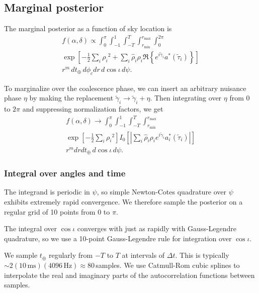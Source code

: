\documentclass[amsmath,amssymb,aps,prx,reprint,nopreprintnumbers,nofootinbib]{revtex4-1}
\begin{document}
\subsection{Marginal posterior}

The marginal posterior as a function of sky location is
%
\begin{multline}
    f(\alpha, \delta) \propto
    \int_{0}^{\pi}
    \int_{-1}^{1}
    \int_{-T}^{T}
    \int_{r_\mathrm{min}}^{r_\mathrm{max}}
    \int_{0}^{2\pi} \\
    \exp \left[ - \frac{1}{2} \sum_i {\rho_i}^2
        + \sum_i \hat\rho_i \rho_i \Re \left\{ e^{i \tilde{\gamma}_i}
        a^*(\tilde{\tau}_i)
        \right\}
    \right] \\
    r^m \, dt_\oplus \, d\phi_c dr \, d\cos{\iota} \, d\psi.
\end{multline}

To marginalize over the coalescence phase, we can insert an arbitrary nuisance phase $\eta$ by making the replacement $\tilde{\gamma}_i \rightarrow \tilde{\gamma}_i + \eta$. Then integrating over $\eta$ from $0$ to $2\pi$ and suppressing normalization factors, we get
%
\begin{multline}
    f(\alpha, \delta) \rightarrow
    \int_{0}^{\pi}
    \int_{-1}^{1}
    \int_{-T}^{T}
    \int_{r_\mathrm{min}}^{r_\mathrm{max}} \\
    \exp \left[ - \frac{1}{2} \sum_i {\rho_i}^2 \right] I_0 \left[
            \left| \sum_i \hat\rho_i \rho_i e^{i \tilde{\gamma}_i} a_i^*(\tilde{\tau}_i)
            \right|
    \right] \\
    r^m dr dt_\oplus \, d\cos{\iota} \, d\psi.
\end{multline}

\subsubsection{Integral over angles and time}

The integrand is periodic in $\psi$, so simple Newton-Cotes quadrature over $\psi$ exhibits extremely rapid convergence. We therefore sample the posterior on a regular grid of 10 points from 0 to $\pi$.

The integral over $\cos\iota$ converges with just as rapidly with Gauss-Legendre quadrature, so we use a 10\nobreakdashes-point Gauss-Legendre rule for integration over $\cos\iota$.

We sample $t_\oplus$ regularly from $-T$ to $T$ at intervals of $\Delta t$. This is typically $\sim 2 (10\,\mathrm{ms})(4096\,\mathrm{Hz}) \approx 80$\,samples. We use Catmull\nobreakdashes-Rom cubic splines to interpolate the real and imaginary parts of the autocorrelation functions between samples.
\end{document}
